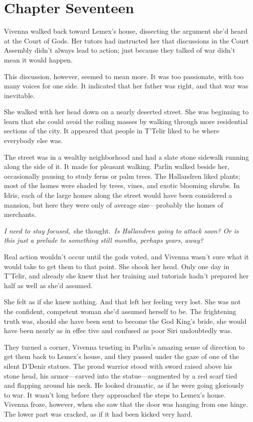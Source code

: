 \section{Chapter Seventeen}

Vivenna walked back toward Lemex’s house, dissecting the argument she’d heard at the Court of Gods. Her tutors had instructed her that discussions in the Court Assembly didn’t always lead to action; just because they talked of war didn’t mean it would happen.

This discussion, however, seemed to mean more. It was too passionate, with too many voices for one side. It indicated that her father was right, and that war was inevitable.

She walked with her head down on a nearly deserted street. She was beginning to learn that she could avoid the roiling masses by walking through more residential sections of the city. It appeared that people in T’Telir liked to be where everybody else was.

The street was in a wealthy neighborhood and had a slate stone sidewalk running along the side of it. It made for pleasant walking. Parlin walked beside her, occasionally pausing to study ferns or palm trees. The Hallandren liked plants; most of the homes were shaded by trees, vines, and exotic blooming shrubs. In Idris, each of the large homes along the street would have been considered a mansion, but here they were only of average size—probably the homes of merchants.

\textit{I need to stay focused,}~she thought.~\textit{Is Hallandren going to attack soon? Or is this just a prelude to something still months, perhaps years, away?}

Real action wouldn’t occur until the gods voted, and Vivenna wasn’t sure what it would take to get them to that point. She shook her head. Only one day in T’Telir, and already she knew that her training and tutorials hadn’t prepared her half as well as she’d assumed.

She felt as if she knew nothing. And that left her feeling very lost. She was not the confident, competent woman she’d assumed herself to be. The frightening truth was, should she have been sent to become the God King’s bride, she would have been nearly as in effec tive and confused as poor Siri undoubtedly was.

They turned a corner, Vivenna trusting in Parlin’s amazing sense of direction to get them back to Lemex’s house, and they passed under the gaze of one of the silent D’Denir statues. The proud warrior stood with sword raised above his stone head, his armor—carved into the statue—augmented by a red scarf tied and flapping around his neck. He looked dramatic, as if he were going gloriously to war. It wasn’t long before they approached the steps to Lemex’s house. Vivenna froze, however, when she saw that the door was hanging from one hinge. The lower part was cracked, as if it had been kicked very hard.

